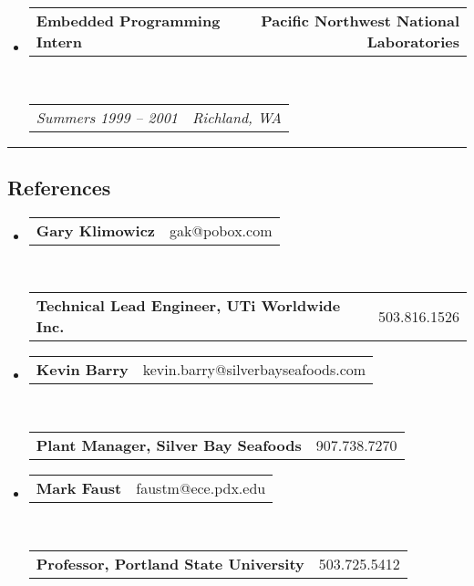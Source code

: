 \documentclass[10pt,letterpaper]{article}
\makeatletter
\newcommand{\headerrow}[2]
{\begin{tabular*}{\linewidth}{l@{\extracolsep{\fill}}r}
	#1 &
	#2 \\
\end{tabular*}}
\makeatother
\begin{document}
\begin{itemize}
	\item
	\headerrow
		{\textbf{Embedded Programming Intern}}
		{\textbf{Pacific Northwest National Laboratories}}
	\\
	\headerrow
		{\emph{Summers 1999 -- 2001}}
		{\emph{Richland, WA}}

\end{itemize}

\hrule
\vspace{-0.4em}
\subsection*{References}
\begin{itemize}
  \item
  \headerrow
    {\textbf{Gary Klimowicz}}
    {gak@pobox.com}
  \\
  \headerrow
    {\textbf{Technical Lead Engineer, UTi Worldwide Inc.}}
    {503.816.1526}
  \item
  \headerrow
    {\textbf{Kevin Barry}}
    {kevin.barry@silverbayseafoods.com}
  \\
  \headerrow
    {\textbf{Plant Manager, Silver Bay Seafoods}}
    {907.738.7270}
  \item
  \headerrow
    {\textbf{Mark Faust}}
    {faustm@ece.pdx.edu}
  \\
  \headerrow
    {\textbf{Professor, Portland State University}}
    {503.725.5412}
    
\end{itemize}
\end{document}
